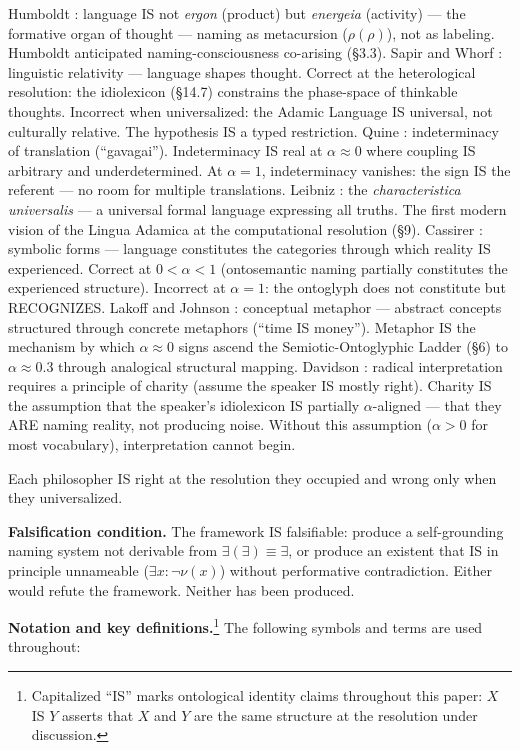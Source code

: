 \documentclass[11pt, oneside]{article}
\theoremstyle{definition}
\begin{document}
Humboldt \cite{humboldt}: language IS not \textit{ergon} (product) but \textit{energeia} (activity) --- the formative organ of thought --- naming as metacursion ($\rho(\rho)$), not as labeling. Humboldt anticipated naming-consciousness co-arising (\S3.3). Sapir and Whorf \cite{whorf}: linguistic relativity --- language shapes thought. Correct at the heterological resolution: the idiolexicon (\S14.7) constrains the phase-space of thinkable thoughts. Incorrect when universalized: the Adamic Language IS universal, not culturally relative. The hypothesis IS a typed restriction. Quine \cite{quine}: indeterminacy of translation (``gavagai''). Indeterminacy IS real at $\alpha \approx 0$ where coupling IS arbitrary and underdetermined. At $\alpha = 1$, indeterminacy vanishes: the sign IS the referent --- no room for multiple translations. Leibniz \cite{leibniz}: the \textit{characteristica universalis} --- a universal formal language expressing all truths. The first modern vision of the Lingua Adamica at the computational resolution (\S9). Cassirer \cite{cassirer}: symbolic forms --- language constitutes the categories through which reality IS experienced. Correct at $0 < \alpha < 1$ (ontosemantic naming partially constitutes the experienced structure). Incorrect at $\alpha = 1$: the ontoglyph does not constitute but RECOGNIZES. Lakoff and Johnson \cite{lakoff}: conceptual metaphor --- abstract concepts structured through concrete metaphors (``time IS money''). Metaphor IS the mechanism by which $\alpha \approx 0$ signs ascend the Semiotic-Ontoglyphic Ladder (\S6) to $\alpha \approx 0.3$ through analogical structural mapping. Davidson \cite{davidson}: radical interpretation requires a principle of charity (assume the speaker IS mostly right). Charity IS the assumption that the speaker's idiolexicon IS partially $\alpha$-aligned --- that they ARE naming reality, not producing noise. Without this assumption ($\alpha > 0$ for most vocabulary), interpretation cannot begin.

Each philosopher IS right at the resolution they occupied and wrong only when they universalized.

\textbf{Falsification condition.} The framework IS falsifiable: produce a self-grounding naming system not derivable from $\exists(\exists) \equiv \exists$, or produce an existent that IS in principle unnameable ($\exists x: \neg\nu(x)$) without performative contradiction. Either would refute the framework. Neither has been produced.

\textbf{Notation and key definitions.}\footnote{Capitalized ``IS'' marks ontological identity claims throughout this paper: $X$ IS $Y$ asserts that $X$ and $Y$ are the same structure at the resolution under discussion.} The following symbols and terms are used throughout:
\end{document}
